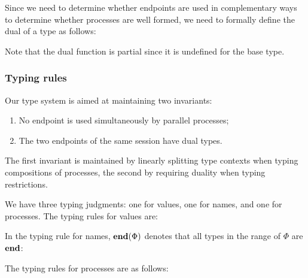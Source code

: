 Since we need to determine whether endpoints are used in complementary ways to determine whether processes are well formed, we need to formally define the dual of a type as follows:
Note that the dual function is partial since it is undefined for the base type.

\subsubsection{Typing rules}
Our type system is aimed at maintaining two invariants:
\begin{enumerate}
\item No endpoint is used simultaneously by parallel processes;
\item The two endpoints of the same session have dual types.
\end{enumerate}
The first invariant is maintained by linearly splitting type contexts when typing compositions of processes, the second  by requiring duality when typing restrictions.

We have three typing judgments: one for values, one for names, and one for processes.
The typing rules for values are:
In the typing rule for names, $\tend \Phi$ denotes that all types in the range of $\Phi$ are $\Tend$:
\begin{mathpar}
\end{mathpar}
The typing rules for processes are as follows:

